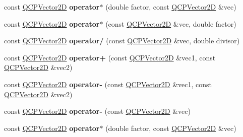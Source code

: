 \begin{DoxyCompactItemize}
\item 
const \hyperlink{class_q_c_p_vector2_d}{Q\+C\+P\+Vector2D} {\bfseries operator$\ast$} (double factor, const \hyperlink{class_q_c_p_vector2_d}{Q\+C\+P\+Vector2D} \&vec)\hypertarget{class_q_c_p_vector2_d_aa75268fb64b9eaee5448fb815007bee9}{}\label{class_q_c_p_vector2_d_aa75268fb64b9eaee5448fb815007bee9}

\item 
const \hyperlink{class_q_c_p_vector2_d}{Q\+C\+P\+Vector2D} {\bfseries operator$\ast$} (const \hyperlink{class_q_c_p_vector2_d}{Q\+C\+P\+Vector2D} \&vec, double factor)\hypertarget{class_q_c_p_vector2_d_aace10d28a76e84e7380ede1a9cb58274}{}\label{class_q_c_p_vector2_d_aace10d28a76e84e7380ede1a9cb58274}

\item 
const \hyperlink{class_q_c_p_vector2_d}{Q\+C\+P\+Vector2D} {\bfseries operator/} (const \hyperlink{class_q_c_p_vector2_d}{Q\+C\+P\+Vector2D} \&vec, double divisor)\hypertarget{class_q_c_p_vector2_d_aa69909afc8c656999a2ea292ea01244b}{}\label{class_q_c_p_vector2_d_aa69909afc8c656999a2ea292ea01244b}

\item 
const \hyperlink{class_q_c_p_vector2_d}{Q\+C\+P\+Vector2D} {\bfseries operator+} (const \hyperlink{class_q_c_p_vector2_d}{Q\+C\+P\+Vector2D} \&vec1, const \hyperlink{class_q_c_p_vector2_d}{Q\+C\+P\+Vector2D} \&vec2)\hypertarget{class_q_c_p_vector2_d_a24cc5985429b12dbed4d0d3c5a917d20}{}\label{class_q_c_p_vector2_d_a24cc5985429b12dbed4d0d3c5a917d20}

\item 
const \hyperlink{class_q_c_p_vector2_d}{Q\+C\+P\+Vector2D} {\bfseries operator-\/} (const \hyperlink{class_q_c_p_vector2_d}{Q\+C\+P\+Vector2D} \&vec1, const \hyperlink{class_q_c_p_vector2_d}{Q\+C\+P\+Vector2D} \&vec2)\hypertarget{class_q_c_p_vector2_d_a9e01331d8debf0877ee4cba9abd83605}{}\label{class_q_c_p_vector2_d_a9e01331d8debf0877ee4cba9abd83605}

\item 
const \hyperlink{class_q_c_p_vector2_d}{Q\+C\+P\+Vector2D} {\bfseries operator-\/} (const \hyperlink{class_q_c_p_vector2_d}{Q\+C\+P\+Vector2D} \&vec)\hypertarget{class_q_c_p_vector2_d_a14c807d345ee3f22d6809bb5a4137b52}{}\label{class_q_c_p_vector2_d_a14c807d345ee3f22d6809bb5a4137b52}

\item 
const \hyperlink{class_q_c_p_vector2_d}{Q\+C\+P\+Vector2D} {\bfseries operator$\ast$} (double factor, const \hyperlink{class_q_c_p_vector2_d}{Q\+C\+P\+Vector2D} \&vec)\hypertarget{class_q_c_p_vector2_d_aa75268fb64b9eaee5448fb815007bee9}{}\label{class_q_c_p_vector2_d_aa75268fb64b9eaee5448fb815007bee9}


\end{DoxyCompactItemize}
